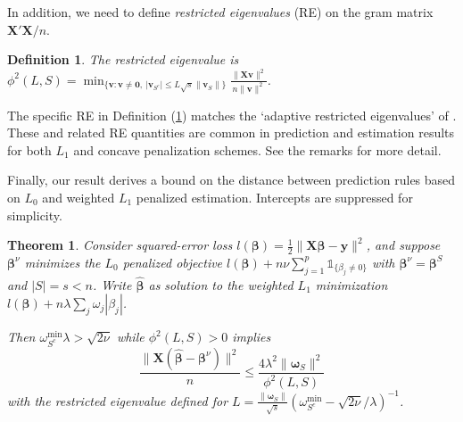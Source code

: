 \documentclass[12pt]{article}
\newtheorem{theorem}{\sc Theorem}[section]
\newtheorem{definition}{\sc Definition}[section]
\newcommand{\bs}[1]{\boldsymbol{#1}}
\newcommand{\mr}[1]{\mathrm{#1}}
\newcommand{\bm}[1]{\mathbf{#1}}
\newcommand{\ds}[1]{\mathds{#1}}
\begin{document}
In addition, we need to define {\it restricted eigenvalues} (RE) on the gram matrix $\bm{X}'\bm{X}/n$.  
\begin{definition}\label{redef}
The restricted eigenvalue is
$
\phi^2(L,S) = \min_{\{\bm{v}: \bm{v}\neq \bm{0},~|\bm{v}_{S^c}| \leq L\sqrt{s}\|\bm{v}_S\|\}}\frac{\|\bm{X}\bm{v}\|^2}{n\|\bm{v}\|^2}$.
\end{definition}
\noindent The specific RE in Definition (\ref{redef}) matches the `adaptive restricted eigenvalues' of \cite{buhlmann_statistics_2011}.  These and related RE quantities are common in prediction and estimation results for both $L_1$ and concave penalization schemes.  See the remarks for more detail.

Finally, our result derives a bound on the distance between prediction rules based on $L_0$ and weighted $L_1$ penalized estimation.  Intercepts are suppressed for simplicity.
\begin{theorem} \label{sparseapprox}  Consider squared-error loss $l(\bs{\beta}) =
\frac{1}{2}\|\bm{X}\bs{\beta}-\bm{y}\|^2$, and suppose $\bs{\beta}^{\nu}$ minimizes the $L_0$ penalized objective $l(\bs{\beta}) + n\nu\sum_{j=1}^p\ds{1}_{\{\beta_j\neq0\}}$ with $\bs{\beta}^\nu = \bs{\beta}^S$ and $|S|=s<n$.   
Write $\bs{\hat\beta}$ as solution to the weighted $L_1$ minimization $l(\bs{\beta}) + n\lambda\sum_j\omega_j|\beta_j|$. 

Then  
$\omega^{\mr{min}}_{S^c}\lambda > \sqrt{2\nu}$ while $\phi^2(L,S) > 0$ implies
\begin{equation} \label{sparseineq}
\frac{\|\bm{X}(\bs{\hat\beta}-\bs{\beta}^\nu)\|^2}{n}\leq
\frac{4\lambda^2 \|\bs{\omega}_S\|^2}{\phi^2(L, S)}
\end{equation} 
with the restricted eigenvalue defined for 
 $L = \frac{\|\bs{\omega}_S\|}{\sqrt{s}}\left(\omega^{\mr{min}}_{S^c}-\sqrt{2\nu}/\lambda\right)^{-1}$.
\end{theorem}
\end{document}
